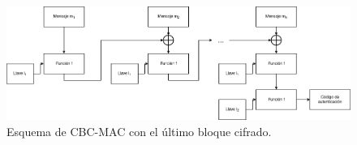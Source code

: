 \begin{figure}
  \begin{center}
    \includegraphics[width=0.9\linewidth]{diagramas/cbcmaclb.png}
    \caption{Esquema de CBC-MAC con el último bloque cifrado.}
    \label{mac:cbc2}
  \end{center}
\end{figure}




